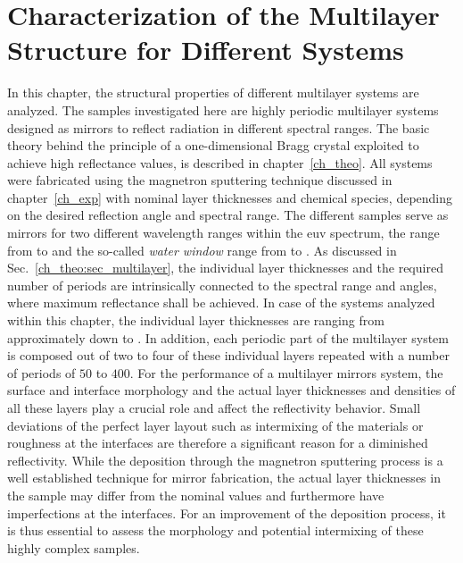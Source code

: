 \chapter{Characterization of the Multilayer Structure for Different Systems} \label{ch_spec}
In this chapter, the structural properties of different multilayer systems are analyzed. The samples investigated here are highly periodic multilayer systems designed as mirrors to reflect radiation in different spectral ranges. The basic theory behind the principle of a one-dimensional Bragg crystal exploited to achieve high reflectance values, is described in chapter~\ref{ch_theo}. All systems were fabricated using the magnetron sputtering technique discussed in chapter~\ref{ch_exp} with nominal layer thicknesses and chemical species, depending on the desired reflection angle and spectral range. The different samples serve as mirrors for two different wavelength ranges within the \gls{euv} spectrum, the range from  to  and the so-called \emph{water window} range from  to . As discussed in Sec.~\ref{ch_theo:sec_multilayer}, the individual layer thicknesses and the required number of periods are intrinsically connected to the spectral range and angles, where maximum reflectance shall be achieved. In case of the systems analyzed within this chapter, the individual layer thicknesses are ranging from approximately  down to . In addition, each periodic part of the multilayer system is composed out of two to four of these individual layers repeated with a number of periods of $50$ to $400$. For the performance of a multilayer mirrors system, the surface and interface morphology and the actual layer thicknesses and densities of all these layers play a crucial role and affect the reflectivity behavior. Small deviations of the perfect layer layout such as intermixing of the materials or roughness at the interfaces are therefore a significant reason for a diminished reflectivity. While the deposition through the magnetron sputtering process is a well established technique for mirror fabrication, the actual layer thicknesses in the sample may differ from the nominal values and furthermore have imperfections at the interfaces. For an improvement of the deposition process, it is thus essential to assess the morphology and potential intermixing of these highly complex samples.

